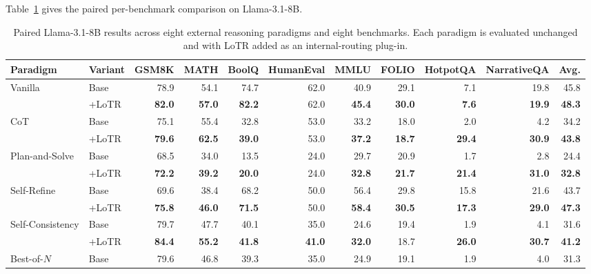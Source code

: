 \documentclass[12pt,a4paper]{article}
\newcommand{\method}[1]{{\sffamily\bfseries\color{MethodBlue}#1}}
\newcommand{\XDB}{\method{XDomainBench}}
\newcommand{\SubspacePath}{\method{SubspacePath Pruner}}
\newcommand{\LoTR}{\method{LoTR}}
\def\method#1{#1}\def\XDB{XDomainBench}\def\SubspacePath{SubspacePath Pruner}%
\begin{document}
Table~\ref{tab:lotr-full} gives the paired per-benchmark comparison on Llama-3.1-8B.
\begin{table}[t]
\centering\singlespacing\scriptsize
\caption{Paired Llama-3.1-8B results across eight external reasoning paradigms and eight benchmarks. Each paradigm is evaluated unchanged and with \LoTR{} added as an internal-routing plug-in.}
\label{tab:lotr-full}
\setlength{\tabcolsep}{2.5pt}
\begin{adjustbox}{max width=\textwidth}
\begin{tabular}{llrrrrrrrrr}
\toprule
\textbf{Paradigm} & \textbf{Variant} & \textbf{GSM8K} & \textbf{MATH} & \textbf{BoolQ} & \textbf{HumanEval} & \textbf{MMLU} & \textbf{FOLIO} & \textbf{HotpotQA} & \textbf{NarrativeQA} & \textbf{Avg.}\\
\midrule
\multirow{2}{*}{Vanilla} & Base & 78.9 & 54.1 & 74.7 & 62.0 & 40.9 & 29.1 & 7.1 & 19.8 & 45.8\\
& +\LoTR{} & \textbf{82.0} & \textbf{57.0} & \textbf{82.2} & 62.0 & \textbf{45.4} & \textbf{30.0} & \textbf{7.6} & \textbf{19.9} & \textbf{48.3}\\
\midrule
\multirow{2}{*}{CoT} & Base & 75.1 & 55.4 & 32.8 & 53.0 & 33.2 & 18.0 & 2.0 & 4.2 & 34.2\\
& +\LoTR{} & \textbf{79.6} & \textbf{62.5} & \textbf{39.0} & 53.0 & \textbf{37.2} & \textbf{18.7} & \textbf{29.4} & \textbf{30.9} & \textbf{43.8}\\
\midrule
\multirow{2}{*}{Plan-and-Solve} & Base & 68.5 & 34.0 & 13.5 & 24.0 & 29.7 & 20.9 & 1.7 & 2.8 & 24.4\\
& +\LoTR{} & \textbf{72.2} & \textbf{39.2} & \textbf{20.0} & 24.0 & \textbf{32.8} & \textbf{21.7} & \textbf{21.4} & \textbf{31.0} & \textbf{32.8}\\
\midrule
\multirow{2}{*}{Self-Refine} & Base & 69.6 & 38.4 & 68.2 & 50.0 & 56.4 & 29.8 & 15.8 & 21.6 & 43.7\\
& +\LoTR{} & \textbf{75.8} & \textbf{46.0} & \textbf{71.5} & 50.0 & \textbf{58.4} & \textbf{30.5} & \textbf{17.3} & \textbf{29.0} & \textbf{47.3}\\
\midrule
\multirow{2}{*}{Self-Consistency} & Base & 79.7 & 47.7 & 40.1 & 35.0 & 24.6 & 19.4 & 1.9 & 4.1 & 31.6\\
& +\LoTR{} & \textbf{84.4} & \textbf{55.2} & \textbf{41.8} & \textbf{41.0} & \textbf{32.0} & 18.7 & \textbf{26.0} & \textbf{30.7} & \textbf{41.2}\\
\midrule
\multirow{2}{*}{Best-of-$N$} & Base & 79.6 & 46.8 & 39.3 & 35.0 & 24.9 & 19.1 & 1.9 & 4.0 & 31.3\\

\end{tabular}
\end{adjustbox}
\end{table}
\end{document}

